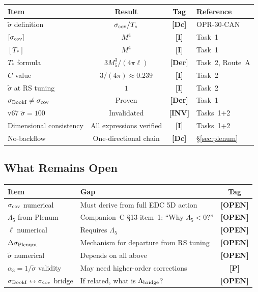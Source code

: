\documentclass[11pt,a4paper]{article}
\newcommand{\tagDer}{\textcolor{derivedblue}{\textbf{[Der]}}}
\newcommand{\tagDc}{\textcolor{conditionalgreen}{\textbf{[Dc]}}}
\newcommand{\tagI}{\textcolor{mathpurple}{\textbf{[I]}}}
\newcommand{\tagP}{\textcolor{proposedred}{\textbf{[P]}}}
\newcommand{\tagOPEN}{\textcolor{openred}{\textbf{[OPEN]}}}
\newcommand{\tagINV}{\textcolor{invalidgray}{\textbf{[INV]}}}
\theoremstyle{definition}
\theoremstyle{remark}
\begin{document}
\begin{center}
\renewcommand{\arraystretch}{1.2}
\begin{tabular}{lccl}
\toprule
\textbf{Item} & \textbf{Result} & \textbf{Tag} & \textbf{Reference} \\
\midrule
$\tilde\sigma$ definition & $\sigma_{\rm cov}/T_*$ & \tagDc & OPR-30-CAN \\
$[\sigma_{\rm cov}]$ & $M^4$ & \tagI & Task~1 \\
$[T_*]$ & $M^4$ & \tagI & Task~1 \\
$T_*$ formula & $3M_5^3/(4\pi\ell)$ & \tagDer & Task~2, Route~A \\
$C$ value & $3/(4\pi) \approx 0.239$ & \tagI & Task~2 \\
$\tilde\sigma$ at RS tuning & $1$ & \tagI & Task~2 \\
$\sigma_{\rm BookI} \neq \sigma_{\rm cov}$ & Proven & \tagDer & Task~1 \\
v67 $\tilde\sigma=100$ & Invalidated & \tagINV & Tasks~1+2 \\
Dimensional consistency & All expressions verified & \tagI & Tasks~1+2 \\
No-backflow & One-directional chain & \tagDc & \S\ref{sec:plenum} \\
\bottomrule
\end{tabular}
\end{center}

\subsection{What Remains Open}

\begin{center}
\renewcommand{\arraystretch}{1.2}
\begin{tabular}{lp{6cm}c}
\toprule
\textbf{Item} & \textbf{Gap} & \textbf{Tag} \\
\midrule
$\sigma_{\rm cov}$ numerical & Must derive from full EDC 5D action
  & \tagOPEN \\
$\Lambda_5$ from Plenum & Companion~C \S13 item~1:
  ``Why $\Lambda_5 < 0$?'' & \tagOPEN \\
$\ell$ numerical & Requires $\Lambda_5$ & \tagOPEN \\
$\Delta\sigma_{\rm Plenum}$ & Mechanism for departure from RS tuning
  & \tagOPEN \\
$\tilde\sigma$ numerical & Depends on all above & \tagOPEN \\
$\alpha_3 = 1/\tilde\sigma$ validity & May need higher-order corrections
  & \tagP \\
$\sigma_{\rm BookI} \leftrightarrow \sigma_{\rm cov}$ bridge &
  If related, what is $\Lambda_{\rm bridge}$? & \tagOPEN \\
\bottomrule
\end{tabular}
\end{center}
\end{document}
